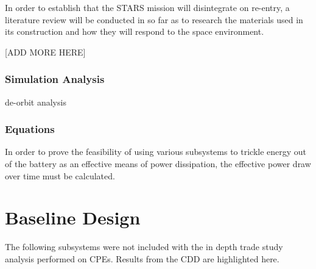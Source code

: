 \documentclass{ece}
\begin{document}
In order to establish that the STARS mission will disintegrate on re-entry, a literature review will be conducted in so far as to research the materials used in its construction and how they will respond to the space environment. 

[ADD MORE HERE]

\subsubsection{Simulation Analysis}
de-orbit analysis
\subsubsection{Equations}
In order to prove the feasibility of using various subsystems to trickle energy out of the battery as an effective means of power dissipation, the effective power draw over time must be calculated. 

\section{Baseline Design}

The following subsystems were not included with the in depth trade study analysis performed on CPEs.  Results from the CDD are highlighted here.
\bigskip
\end{document}
